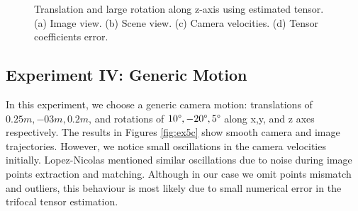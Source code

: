 \begin{figure}[ht!]
\begin{subfigure}{.48\linewidth}
    \caption{}
    \label{fig:ex4cerror}
  \end{subfigure}
  \caption{Translation and large rotation along z-axis using estimated tensor. (a) Image view. (b) Scene view. (c) Camera velocities. (d) Tensor coefficients error.}
  \label{fig:ex4c}
\end{figure}

\subsection{Experiment IV: Generic Motion}
In this experiment, we choose a generic camera motion: translations of $0.25m, -03m, 0.2m$, and rotations of $10\text{\textdegree}, -20\text{\textdegree}, 5\text{\textdegree}$ along x,y, and z axes respectively. The results in Figures \ref{fig:ex5c} show smooth camera and image trajectories. However, we notice small oscillations in the camera velocities initially. Lopez-Nicolas \cite{lopez2010visual} mentioned similar oscillations due to noise during image points extraction and matching. Although in our case we omit points mismatch and outliers, this behaviour is most likely due to small numerical error in the trifocal tensor estimation.

